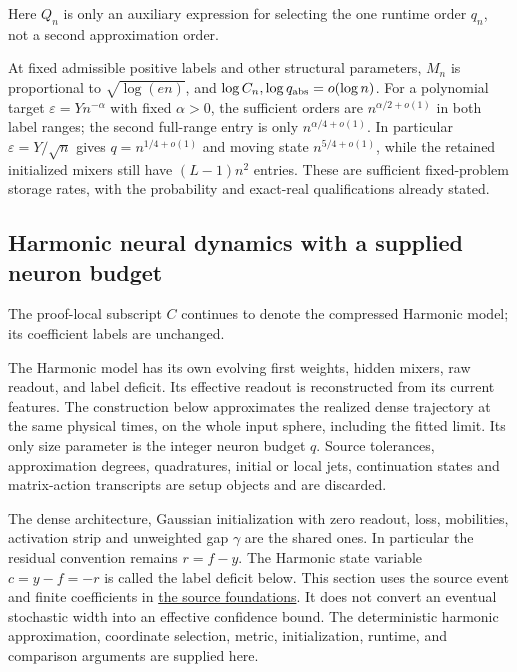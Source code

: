 Here \(Q_n\) is only an auxiliary expression for selecting the one runtime order \(q_n\), not a second approximation order.



At fixed admissible positive labels and other structural parameters, \(M_n\) is proportional to \(\sqrt{\log(en)}\), and \(\log C_n,\allowbreak \log q_{\rm abs}=o(\log n)\). For a polynomial target \(\varepsilon=Yn^{-\alpha}\) with fixed \(\alpha>0\), the sufficient orders are \(n^{\alpha/2+o(1)}\) in both label ranges; the second full-range entry is only \(n^{\alpha/4+o(1)}\). In particular \(\varepsilon=Y/\sqrt n\) gives \(q=n^{1/4+o(1)}\) and moving state \(n^{5/4+o(1)}\), while the retained initialized mixers still have \((L-1)n^2\) entries. These are sufficient fixed-problem storage rates, with the probability and exact-real qualifications already stated.


\subsection{Harmonic neural dynamics with a supplied neuron budget}
\label{int:compact-construction}
\label{int:harmonic-construction}


The proof-local subscript \(C\) continues to denote the compressed Harmonic model; its coefficient labels are unchanged.



The Harmonic model has its own evolving first weights, hidden mixers, raw readout, and label deficit. Its effective readout is reconstructed from its current features. The construction below approximates the realized dense trajectory at the same physical times, on the whole input sphere, including the fitted limit. Its only size parameter is the integer neuron budget \(q\). Source tolerances, approximation degrees, quadratures, initial or local jets, continuation states and matrix-action transcripts are setup objects and are discarded.



The dense architecture, Gaussian initialization with zero readout, loss, mobilities, activation strip and unweighted gap \(\gamma\) are the shared ones. In particular the residual convention remains \(r=f-y\). The Harmonic state variable \(c=y-f=-r\) is called the label deficit below. This section uses the source event and finite coefficients in \hyperref[int:source-foundations]{the source foundations}. It does not convert an eventual stochastic width into an effective confidence bound. The deterministic harmonic approximation, coordinate selection, metric, initialization, runtime, and comparison arguments are supplied here.



